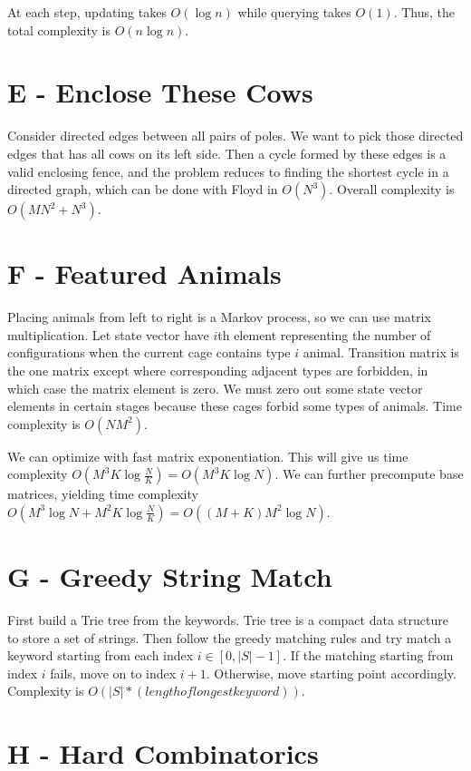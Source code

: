 \documentclass{article}
\begin{document}
At each step, updating takes $O(\log{n})$ while querying takes $O(1)$. Thus, the total complexity is $O(n\log{n})$.


\section*{E - Enclose These Cows}
Consider directed edges between all pairs of poles. We want to pick those directed edges that has all cows on its left side. Then a cycle formed by these edges is a valid enclosing fence, and the problem reduces to finding the shortest cycle in a directed graph, which can be done with Floyd in $O(N^3)$. Overall complexity is $O(M N^2 + N^3)$. 

\section*{F - Featured Animals}

Placing animals from left to right is a Markov process, so we can use matrix multiplication. Let state vector have $i$th element representing the number of configurations when the current cage contains type $i$ animal. Transition matrix is the one matrix except where corresponding adjacent types are forbidden, in which case the matrix element is zero. We must zero out some state vector elements in certain stages because these cages forbid some types of animals. Time complexity is $O(N M^2)$. 

We can optimize with fast matrix exponentiation. This will give us time complexity $O(M^3 K \log{\frac{N}{K}}) = O(M^3 K \log{N})$. We can further precompute base matrices, yielding time complexity $O(M^3 \log{N} + M^2 K \log{\frac{N}{K}}) = O((M+K) M^2 \log{N})$. 

\section*{G - Greedy String Match}

First build a Trie tree from the keywords. Trie tree is a compact data structure to store a set of strings. Then follow the greedy matching rules and try match a keyword starting from each index $i \in [0, |S|-1]$. If the matching starting from index $i$ fails, move on to index $i+1$. Otherwise, move starting point accordingly. Complexity is $O(|S| * (length of longest keyword))$. 

\section*{H - Hard Combinatorics}
\end{document}
